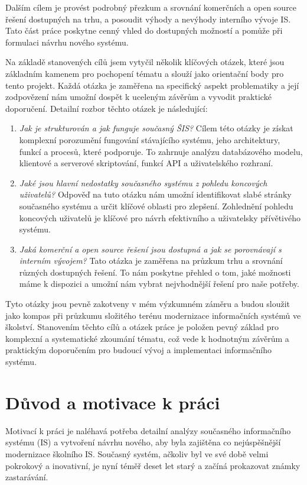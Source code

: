 \documentclass[FM,Proj]{tulthesis}
\begin{document}
Dalším cílem je provést podrobný přezkum a srovnání komerčních a open source řešení
dostupných na trhu, a posoudit výhody a nevýhody interního vývoje IS. Tato část 
práce poskytne cenný vhled do dostupných možností a pomůže při formulaci 
návrhu nového systému.

Na základě stanovených cílů jsem vytyčil několik klíčových otázek, které 
jsou základním kamenem pro pochopení tématu a slouží jako orientační body pro tento 
projekt. Každá otázka je zaměřena na specifický aspekt problematiky a její 
zodpovězení nám umožní dospět k uceleným závěrům a vyvodit praktické doporučení. 
Detailní rozbor těchto otázek je následující:

\begin{enumerate}
\item \textit{Jak je strukturován a jak funguje současný ŠIS?} 
Cílem této otázky je získat komplexní porozumění fungování stávajícího systému, 
jeho architektury, funkcí a procesů, které podporuje. To zahrnuje analýzu 
databázového modelu, klientové a serverové skriptování, funkcí API a uživatelského rozhraní.

\item \textit{Jaké jsou hlavní nedostatky současného systému z pohledu koncových uživatelů?}
 Odpověď na tuto otázku nám umožní identifikovat slabé stránky současného systému a 
 určit klíčové oblasti pro zlepšení. Zohlednění pohledu koncových uživatelů je 
 klíčové pro návrh efektivního a uživatelsky přívětivého systému.

\item \textit{Jaká komerční a open source řešení jsou dostupná a jak se porovnávají s 
interním vývojem?} Tato otázka je zaměřena na průzkum trhu a srovnání různých dostupných 
řešení. To nám poskytne přehled o tom, jaké možnosti máme k dispozici a umožní nám vybrat 
nejvhodnější řešení pro naše potřeby.
\end{enumerate}

Tyto otázky jsou pevně zakotveny v mém výzkumném záměru a budou sloužit jako kompas 
při průzkumu složitého terénu modernizace informačních systémů ve školství.
Stanovením těchto cílů a otázek práce je položen pevný základ pro komplexní a 
systematické zkoumání tématu, což vede k hodnotným závěrům a praktickým 
doporučením pro budoucí vývoj a implementaci informačního systému.

\section{Důvod a motivace k práci}
Motivací k práci je naléhavá potřeba detailní analýzy současného informačního 
systému (IS) a vytvoření návrhu nového, aby byla zajištěna co nejúspěšnější 
modernizace školního IS. Současný systém, ačkoliv byl ve své době velmi pokrokový 
a inovativní, je nyní téměř deset let starý a začíná prokazovat známky zastarávání.
\end{document}
